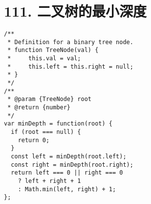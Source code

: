 \newpage
\section{111. 二叉树的最小深度}
\label{leetcode:111}

\begin{verbatim}
/**
 * Definition for a binary tree node.
 * function TreeNode(val) {
 *     this.val = val;
 *     this.left = this.right = null;
 * }
 */
/**
 * @param {TreeNode} root
 * @return {number}
 */
var minDepth = function(root) {
  if (root === null) {
    return 0;
  }
  const left = minDepth(root.left);
  const right = minDepth(root.right);
  return left === 0 || right === 0
    ? left + right + 1
    : Math.min(left, right) + 1;
};
\end{verbatim}